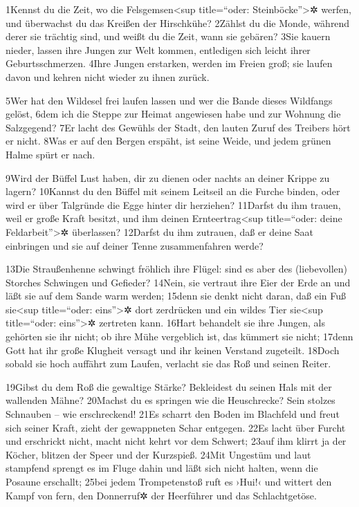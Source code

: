 1Kennst du die Zeit, wo die Felsgemsen\textless sup title=``oder:
Steinböcke''\textgreater✲ werfen, und überwachst du das Kreißen der
Hirschkühe? 2Zählst du die Monde, während derer sie trächtig sind, und
weißt du die Zeit, wann sie gebären? 3Sie kauern nieder, lassen ihre
Jungen zur Welt kommen, entledigen sich leicht ihrer Geburtsschmerzen.
4Ihre Jungen erstarken, werden im Freien groß; sie laufen davon und
kehren nicht wieder zu ihnen zurück.

5Wer hat den Wildesel frei laufen lassen und wer die Bande dieses
Wildfangs gelöst, 6dem ich die Steppe zur Heimat angewiesen habe und zur
Wohnung die Salzgegend? 7Er lacht des Gewühls der Stadt, den lauten
Zuruf des Treibers hört er nicht. 8Was er auf den Bergen erspäht, ist
seine Weide, und jedem grünen Halme spürt er nach.

9Wird der Büffel Lust haben, dir zu dienen oder nachts an deiner Krippe
zu lagern? 10Kannst du den Büffel mit seinem Leitseil an die Furche
binden, oder wird er über Talgründe die Egge hinter dir herziehen?
11Darfst du ihm trauen, weil er große Kraft besitzt, und ihm deinen
Ernteertrag\textless sup title=``oder: deine Feldarbeit''\textgreater✲
überlassen? 12Darfst du ihm zutrauen, daß er deine Saat einbringen und
sie auf deiner Tenne zusammenfahren werde?

13Die Straußenhenne schwingt fröhlich ihre Flügel: sind es aber des
(liebevollen) Storches Schwingen und Gefieder? 14Nein, sie vertraut ihre
Eier der Erde an und läßt sie auf dem Sande warm werden; 15denn sie
denkt nicht daran, daß ein Fuß sie\textless sup title=``oder:
eins''\textgreater✲ dort zerdrücken und ein wildes Tier sie\textless sup
title=``oder: eins''\textgreater✲ zertreten kann. 16Hart behandelt sie
ihre Jungen, als gehörten sie ihr nicht; ob ihre Mühe vergeblich ist,
das kümmert sie nicht; 17denn Gott hat ihr große Klugheit versagt und
ihr keinen Verstand zugeteilt. 18Doch sobald sie hoch auffährt zum
Laufen, verlacht sie das Roß und seinen Reiter.

19Gibst du dem Roß die gewaltige Stärke? Bekleidest du seinen Hals mit
der wallenden Mähne? 20Machst du es springen wie die Heuschrecke? Sein
stolzes Schnauben -- wie erschreckend! 21Es scharrt den Boden im
Blachfeld und freut sich seiner Kraft, zieht der gewappneten Schar
entgegen. 22Es lacht über Furcht und erschrickt nicht, macht nicht kehrt
vor dem Schwert; 23auf ihm klirrt ja der Köcher, blitzen der Speer und
der Kurzspieß. 24Mit Ungestüm und laut stampfend sprengt es im Fluge
dahin und läßt sich nicht halten, wenn die Posaune erschallt; 25bei
jedem Trompetenstoß ruft es ›Hui!‹ und wittert den Kampf von fern, den
Donnerruf✲ der Heerführer und das Schlachtgetöse.

